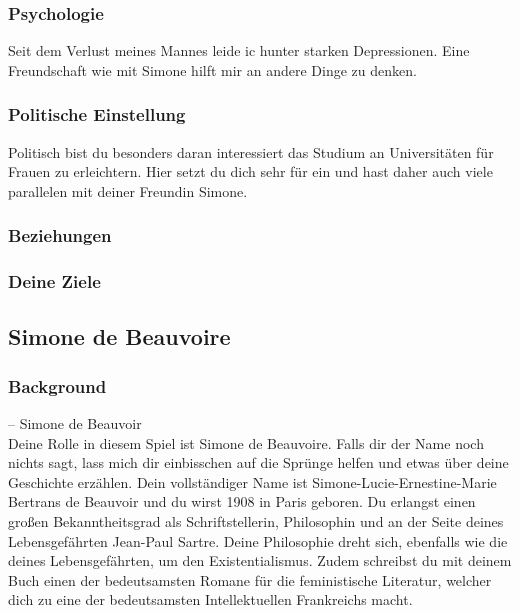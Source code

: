 \documentclass[12pt, a4paper, openany]{report}
\begin{document}
\subsubsection{Psychologie}

Seit dem Verlust meines Mannes leide ic hunter starken Depressionen. Eine Freundschaft wie mit Simone hilft mir an andere Dinge zu denken.
\subsubsection{Politische Einstellung}
Politisch bist du besonders daran interessiert das Studium an Universitäten für Frauen zu erleichtern. Hier setzt du dich sehr für ein und hast daher auch viele parallelen mit deiner Freundin Simone. 
\subsubsection{Beziehungen}
\subsubsection{Deine Ziele}

\subsection{Simone de Beauvoire}
 
\subsubsection{Background}


– Simone de Beauvoir\\


Deine Rolle in diesem Spiel ist Simone de Beauvoire. Falls dir der Name noch nichts sagt, lass mich dir einbisschen auf die Sprünge helfen und etwas über deine Geschichte erzählen. 
Dein vollständiger Name ist Simone-Lucie-Ernestine-Marie Bertrans de Beauvoir und du wirst 1908 in Paris geboren. Du erlangst einen großen Bekanntheitsgrad als Schriftstellerin, Philosophin und an der Seite deines Lebensgefährten Jean-Paul Sartre. Deine Philosophie dreht sich, ebenfalls wie die deines Lebensgefährten, um den Existentialismus. Zudem schreibst du mit deinem Buch  einen der bedeutsamsten Romane für die feministische Literatur, welcher dich zu eine der bedeutsamsten Intellektuellen Frankreichs macht. \\
\end{document}
